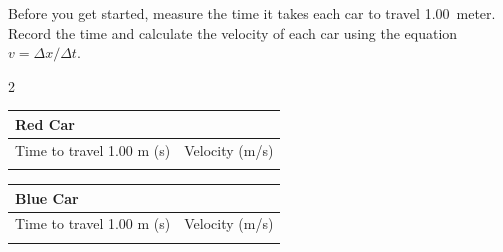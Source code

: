\documentclass[10pt]{exam}
\begin{document}

Before you get started, measure the time it takes each car to travel 1.00~meter.  Record the time and calculate the velocity of each car using the equation $v=\Delta x/\Delta t$.

\begin{multicols}{2}
  \begin{tabular}{|l|c|}
    \hline
    \multicolumn{2}{|l|}{\bf Red Car} \\\hline
    Time to travel 1.00 m (s) &
    Velocity (m/s) \\\hline
    & \\[1em]\hline
  \end{tabular}

  \begin{tabular}{|l|c|}
    \hline
    \multicolumn{2}{|l|}{\bf Blue Car} \\\hline
    Time to travel 1.00 m (s) &
    Velocity (m/s) \\\hline
    & \\[1em]\hline
  \end{tabular}
  
\end{multicols}
\end{document}
